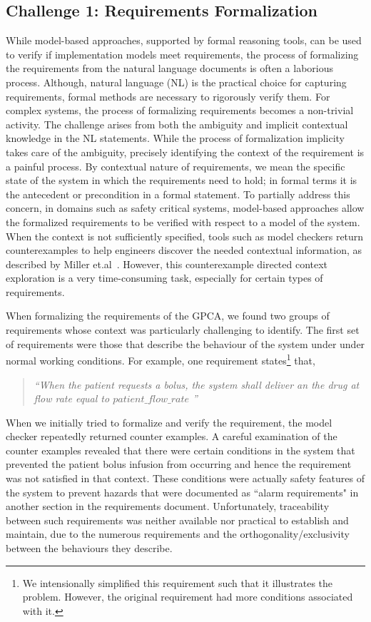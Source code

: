 \subsection{Challenge 1: Requirements Formalization}

While model-based approaches, supported by formal reasoning tools, can be used to verify if implementation models meet requirements, the process of formalizing the requirements from the natural language documents is often a laborious process. Although, natural language (NL) is the practical choice for capturing requirements, formal methods are necessary to rigorously verify them. For complex systems, the process of formalizing requirements becomes a non-trivial activity. The challenge arises from both the ambiguity and implicit contextual knowledge in the NL statements. While the process of formalization implicity takes care of the ambiguity, precisely identifying the context of the requirement is a painful process. By contextual nature of requirements, we mean the specific state of the system in which the requirements need to hold; in formal terms it is the antecedent or precondition in a formal statement. To partially address this concern, in domains such as safety critical systems, model-based approaches allow the formalized requirements to be verified with respect to a model of the system. When the context is not sufficiently specified, tools such as model checkers return counterexamples to help engineers discover the needed contextual information, as described by Miller et.al~\cite{Miller03:shalls}. However, this counterexample directed context exploration is a very time-consuming task, especially for certain types of requirements.

When formalizing the requirements of the GPCA, we found two groups of requirements whose context was particularly challenging to identify. The first set of requirements were those that describe the behaviour of the system under under normal working conditions. For example, one requirement states\footnote{\scriptsize{We intensionally simplified this requirement such that it illustrates the problem. However, the original requirement had more conditions associated with it.}} that,

\begin{quotation}
\emph{``When the patient requests a bolus, the system shall deliver an the drug at flow rate equal to $patient\_flow\_rate$ ''}
\end{quotation}
\vspace{-0.05in}
When we initially tried to formalize and verify the requirement, the model checker repeatedly returned counter examples. A careful examination of the counter examples revealed that there were certain conditions in the system that prevented the patient bolus infusion from occurring and hence the requirement was not satisfied in that context. These conditions were actually safety features of the system to prevent hazards that were documented as ``alarm requirements" in another section in the requirements document.  Unfortunately, traceability between such requirements was neither available nor practical to establish and maintain, due to the numerous requirements and the orthogonality/exclusivity between the behaviours they describe.

